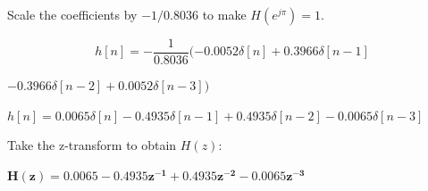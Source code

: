 \documentclass[fleqn]{article}
\begin{document}
\begin{enumerate}[nolistsep]
		Scale the coefficients by $-1/0.8036$ to make $H(e^{j\pi}) = 1$.
		
		\begin{equation*}
			h[n] = -\frac{1}{0.8036}(-0.0052\delta[n] + 0.3966\delta[n-1]
		\end{equation*}
		
		$ - 0.3966\delta[n-2] + 0.0052\delta[n-3])$
		
		$h[n] = 0.0065\delta[n] - 0.4935\delta[n-1] + 0.4935\delta[n-2] - 0.0065\delta[n-3]$
		
		Take the z-transform to obtain $H(z)$:
		
		$\mathbf{H(z) = 0.0065 - 0.4935z^{-1} + 0.4935z^{-2} - 0.0065z^{-3}}$
	\end{enumerate}
\end{document}
